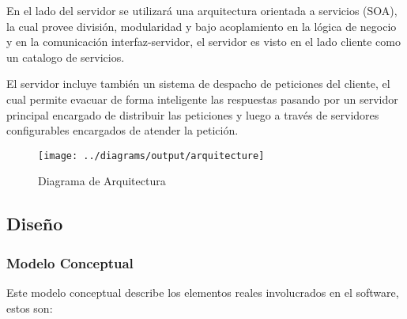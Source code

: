 En el lado del servidor se utilizará una arquitectura orientada a servicios (SOA), la cual provee división, modularidad y bajo acoplamiento en la lógica de negocio y en la comunicación interfaz-servidor, el servidor es visto en el lado cliente como un catalogo de servicios.

El servidor incluye también un sistema de despacho de peticiones del cliente, el cual permite evacuar de forma inteligente las respuestas pasando por un servidor principal encargado de distribuir las peticiones y luego a través de servidores configurables encargados de atender la petición.

\begin{landscape}
\begin{figure}
 \centering
 \texttt{[image: ../diagrams/output/arquitecture]}
 \caption{Diagrama de Arquitectura}
 \label{diagrama:arquitectura}
\end{figure}
\end{landscape}


\subsection{Diseño}

\subsubsection{Modelo Conceptual}

Este modelo conceptual describe los elementos reales involucrados en el software, estos son:

